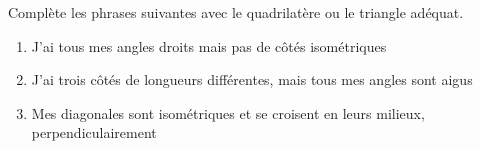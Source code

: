%
%
	Complète les phrases suivantes avec le quadrilatère ou le triangle adéquat.
	\begin{enumerate}[itemsep=1.5cm]
		\item J'ai tous mes angles droits mais pas de côtés isométriques
		\item J'ai trois côtés de longueurs différentes, mais tous mes angles sont aigus
		\item Mes diagonales sont isométriques et se croisent en leurs milieux, perpendiculairement
	\end{enumerate}
    \vspace{1.5cm}
